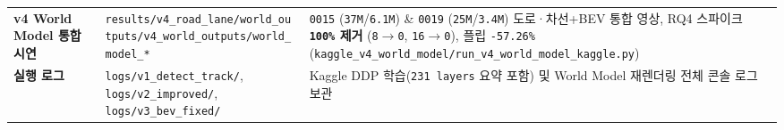 \documentclass[10.5pt,a4paper]{article}
\begin{document}
\begin{footnotesize}
\begin{longtable}{>{\raggedright\arraybackslash}p{} >{\raggedright\arraybackslash}p{} >{\raggedright\arraybackslash}p{}}
\textbf{v4 World Model 통합 시연} & \texttt{results/\allowbreak{}v4\_\allowbreak{}road\_\allowbreak{}lane/\allowbreak{}world\_\allowbreak{}outputs/\allowbreak{}v4\_\allowbreak{}world\_\allowbreak{}outputs/\allowbreak{}world\_\allowbreak{}model\_\allowbreak{}*} & \texttt{0015} (\texttt{37M}/\texttt{6.\allowbreak{}1M}) \& \texttt{0019} (\texttt{25M}/\texttt{3.\allowbreak{}4M}) 도로·차선+BEV 통합 영상, RQ4 스파이크 \textbf{\texttt{100\%} 제거} (\texttt{8$\rightarrow$0}, \texttt{16$\rightarrow$0}), 플립 \texttt{-\allowbreak{}57.\allowbreak{}26\%} (\texttt{kaggle\_\allowbreak{}v4\_\allowbreak{}world\_\allowbreak{}model/\allowbreak{}run\_\allowbreak{}v4\_\allowbreak{}world\_\allowbreak{}model\_\allowbreak{}kaggle.\allowbreak{}py}) \\
\textbf{실행 로그} & \texttt{logs/\allowbreak{}v1\_\allowbreak{}detect\_\allowbreak{}track/\allowbreak{}}, \texttt{logs/\allowbreak{}v2\_\allowbreak{}improved/\allowbreak{}}, \texttt{logs/\allowbreak{}v3\_\allowbreak{}bev\_\allowbreak{}fixed/\allowbreak{}} & Kaggle DDP 학습(\texttt{231 layers} 요약 포함) 및 World Model 재렌더링 전체 콘솔 로그 보관 \\
\end{longtable}
\end{footnotesize}
\end{document}
